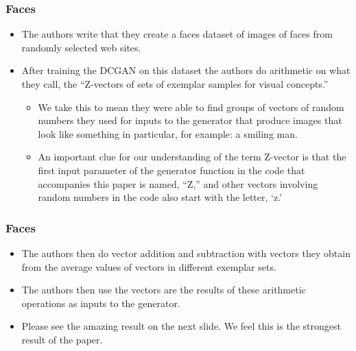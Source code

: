 \documentclass{beamer}
\begin{document}

\begin{frame}
\frametitle{Faces}
\begin{itemize}
\item The authors write that they create a faces dataset of images of faces from
  randomly selected web sites.

\item After training the DCGAN on this dataset the authors do arithmetic on
what they call, the ``Z-vectors of sets of exemplar samples for visual concepts.''

\begin{itemize}
  \item We take this to mean they were able to find groups of vectors of random
  numbers they used for inputs to the generator that produce images that look like
  something in particular, for example: a smiling man.

  \item An important clue for our understanding of the term Z-vector is that the
  first input parameter of the generator function in the code that accompanies this
  paper \cite{dcganCode} is named, ``Z,'' and other vectors involving random numbers
  in the code also start with the letter, `z.'
  \end{itemize}

\end{itemize}
\end{frame}


\begin{frame}
\frametitle{Faces}
\begin{itemize}
\item The authors then do vector addition and subtraction with vectors they obtain
from the average values of vectors in different exemplar sets.

\item The authors then use the vectors are the results of these arithmetic operations
as inputs to the generator.

\item Please see the amazing result on the next slide. We feel this is the strongest
result of the paper. 
\end{itemize}
\end{frame}

\end{document}
